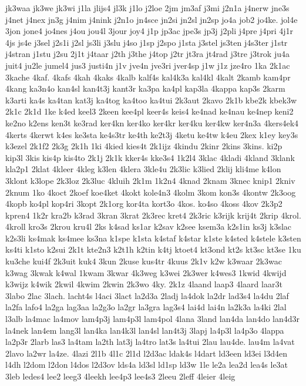 {jk3waa
jk3we
jk3wi
j1la
jlijs4
jl3k
j1lo
j2loe
2jm
jm3af
j3mi
j2n1a
j4nerw
jne3s
j4net
j4nex
jn3g
j4nim
j4nink
j2n1o
jn4sce
jn2si
jn2sl
jn2sp
jo4a
job2
jo4ke.
jol4e
3jon
jone4
jo4nes
j4ou
jou4l
3jour
joy4
j1p
jp3ac
jpe3s
jp3j
j2pli
j4pre
j4pri
4j1r
4js
js4e
j3sel
j2s1i
j2sl
js3li
j3slu
j4so
j1sp
j2spo
j1sta
j3stel
js3ten
j4s3ter
j1str
j4stran
j1stu
j2su
2j1t
j4taar
j2th
j3the
j4top
j2tr
jt3ra
jt4rad
j3tre
j3trok
ju4a
juit4
ju2le
jumel4
jus3
justi4n
j1v
jve4n
jve3ri
jver4sp
j1w
j1z
jze4ro
1ka
2k1ac
3kache
4kaf.
4kafs
4kah
4kaks
4kalb
kalf4s
kal4k3a
kal4kl
4kalt
2kamb
kam4pr
4kang
ka3n4o
kan4sl
kan4t3j
kant3r
ka3pa
ka4pl
kap3la
4kappa
kap3s
2karm
k3arti
ka4s
ka4tan
kat3j
ka4tog
ka4too
ka4tui
2k3aut
2kavo
2k1b
kbe2k
kbek3w
2k1c
2k1d
1ke
k4ed
keel3
2keen
kee4pl
keer4s
keis4
ke4nad
ke4nau
ke4nep
keni2
ke2no
k2ens
ken3t
ke3rad
ker4kn
ker4ko
ker4kr
ker4ku
ker4kw
ker4n3a
4kers4ek4
4kerts
4kerwt
k4es
ke3sta
ke4s3tr
ke4th
ke2t3j
4ketu
ke4tw
k4eu
2kex
k1ey
key3s
k3ezel
2k1f2
2k3g
2k1h
1ki
4kied
kies4t
2k1ijz
4kindu
2kinr
2kins
3kins.
ki2p
kip3l
3kis
kis4p
kis4to
2k1j
2k1k
kker4s
kke3s4
1k2l4
3klac
4kladi
4kland
3klank
kla2p1
2klat
4kleer
4kleg
k3len
4klera
3kle4u
2k3lic
k3lied
2klij
kli4me
k4lon
3klont
k3lope
2k3loz
2k3luc
4kluih
2k1m
1k2n4
4knad
2knam
3knec
knip1
2kniv
2knum
1ko
4koct
2koef
koe4ket
4kokt
kole4n3
4kolm
3kom
kon3s
4kontw
2k3oog
4kopb
ko4pl
kop4ri
3kopt
2k1org
kor4ta
kort3o
4kos.
ko4so
4koss
4kov
2k3p2
kpren4
1k2r
kra2b
k3rad
3kran
3krat
2k3rec
kret4
2k3ric
k3rijk
krij4t
2krip
4krol.
4kroll
kro3s
2krou
kru4l
2ks
k4sad
ks1ar
k2sav
k2see
ksem3a
k2s1in
ks3j
k3slac
k2s3li
ks4mak
ks4mee
ks3na
k1spe
k1sta
k4staf
k4star
k1ste
k4sted
k4stele
k3sten
ks4ti
k1sto
k2sui
2k1t
kte2n3
k2t1h
k2tin
k4tj
ktoet4
kt3ond
kt2s
kt3sc
kt3se
1ku
ku3che
kui4f
2k3uit
kuk4
3kun
2kuse
kus4tr
4kuus
2k1v
k2w
k3waar
2k3wac
k3wag
3kwak
k4wal
1kwam
3kwar
4k3weg
k3wei
2k3wer
k4wes3
1kwid
4kwijd
k3wijz
k4wik
2kwil
4kwim
2kwin
2k3wo
4ky.
2k1z
4laand
laap3
4laard
laar3t
3labo
2lac
3lach.
lacht4s
l4aci
3lact
la2d3a
2ladj
la4dok
la2dr
lad3s4
la4du
2laf
la2fa
lafo4
la2ga
lag3aa
la2g3o
la2gr
la3gra
lag3s4
lai4d
lai4n
la2k3a
la4ki
2lal
l3alb
la4mac
la4mov
lam4p3j
lam4p3l
lam4pol
4lana
3land
lan4da
lan4do
lan4d3r
la4nek
lan4em
lang3l
lan4ka
lan4k3l
lan4sl
lan4t3j
3lapj
la4p3l
la4p3o
4lappa
la2p3r
2larb
las3
la4tam
la2th
lat3j
la4tro
lat3s
la4tui
2lau
lau4de.
lau4m
la4vat
2lavo
la2wr
la4ze.
4lazi
2l1b
4l1c
2l1d
l2d3ac
ldak4s
l4dart
ld3een
ld3ei
l3d4en
l4dh
l2dom
l2don
l4dos
l2d3ov
lds4a
ld3sl
ld1sp
ld3w
1le
le2a
lea2d
lea4s
le3at
3leb
ledes4
lee2
leeg3
4leekh
lee4p3
lee4s3
2leeu
2leff
4leier
4leig
}
